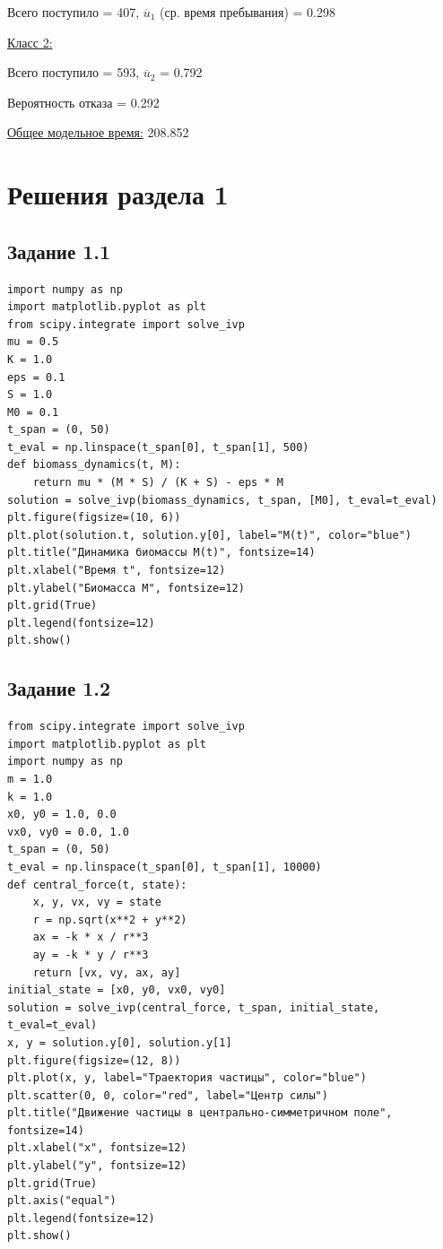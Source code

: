 \documentclass[otchet]{SCWorks}
\begin{document}
Всего поступило = 407, $\overline{u}_1$ (ср. время пребывания) = 0.298

\underline{Класс 2:}

Всего поступило = 593, $\overline{u}_2$ = 0.792

Вероятность отказа = 0.292

\underline{Общее модельное время:} 208.852

\appendix
\section{Решения раздела 1}
\subsection{Задание 1.1}
\label{ap_task1_1}
\begin{verbatim}
import numpy as np
import matplotlib.pyplot as plt
from scipy.integrate import solve_ivp
mu = 0.5
K = 1.0 
eps = 0.1
S = 1.0 
M0 = 0.1
t_span = (0, 50) 
t_eval = np.linspace(t_span[0], t_span[1], 500) 
def biomass_dynamics(t, M):
    return mu * (M * S) / (K + S) - eps * M
solution = solve_ivp(biomass_dynamics, t_span, [M0], t_eval=t_eval)
plt.figure(figsize=(10, 6))
plt.plot(solution.t, solution.y[0], label="M(t)", color="blue")
plt.title("Динамика биомассы M(t)", fontsize=14)
plt.xlabel("Время t", fontsize=12)
plt.ylabel("Биомасса M", fontsize=12)
plt.grid(True)
plt.legend(fontsize=12)
plt.show()
\end{verbatim}

\subsection{Задание 1.2}
\label{ap_task1_2}
\begin{verbatim}
from scipy.integrate import solve_ivp
import matplotlib.pyplot as plt
import numpy as np
m = 1.0 
k = 1.0 
x0, y0 = 1.0, 0.0 
vx0, vy0 = 0.0, 1.0
t_span = (0, 50)  
t_eval = np.linspace(t_span[0], t_span[1], 10000) 
def central_force(t, state):
    x, y, vx, vy = state
    r = np.sqrt(x**2 + y**2) 
    ax = -k * x / r**3 
    ay = -k * y / r**3
    return [vx, vy, ax, ay]
initial_state = [x0, y0, vx0, vy0]
solution = solve_ivp(central_force, t_span, initial_state, t_eval=t_eval)
x, y = solution.y[0], solution.y[1]
plt.figure(figsize=(12, 8))
plt.plot(x, y, label="Траектория частицы", color="blue")
plt.scatter(0, 0, color="red", label="Центр силы")
plt.title("Движение частицы в центрально-симметричном поле", fontsize=14)
plt.xlabel("x", fontsize=12)
plt.ylabel("y", fontsize=12)
plt.grid(True)
plt.axis("equal")
plt.legend(fontsize=12)
plt.show()
\end{verbatim}
\end{document}
